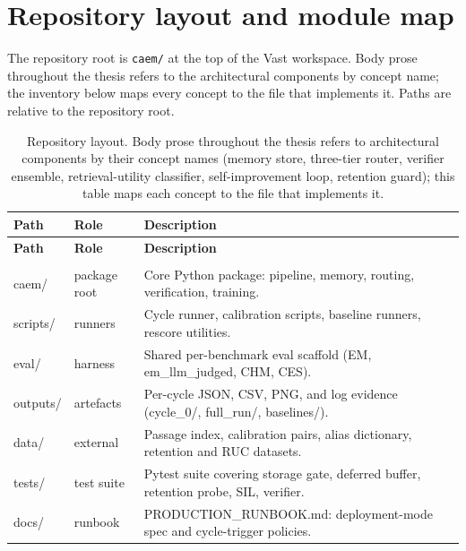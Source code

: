 \section{Repository layout and module map}
\label{app:repo-layout}

The repository root is \verb|caem/| at the top of the Vast workspace. Body prose throughout the thesis refers to the architectural components by concept name; the inventory below maps every concept to the file that implements it. Paths are relative to the repository root.

{\scriptsize
\setlength{\tabcolsep}{4pt}
\renewcommand{\arraystretch}{1.15}
\begin{longtable}{@{}>{\ttfamily}p{5.8cm}p{2.2cm}p{6.6cm}@{}}
\caption[Repository layout]{Repository layout. Body prose throughout the thesis refers to architectural components by their concept names (memory store, three-tier router, verifier ensemble, retrieval-utility classifier, self-improvement loop, retention guard); this table maps each concept to the file that implements it.}
\label{tab:app-repo-layout}\\
\toprule
\textnormal{\textbf{Path}} & \textbf{Role} & \textbf{Description} \\
\midrule
\endfirsthead
\toprule
\textnormal{\textbf{Path}} & \textbf{Role} & \textbf{Description} \\
\midrule
\endhead
\bottomrule
\endfoot
\multicolumn{3}{@{}l}{\textnormal{\textit{Top-level directories}}} \\
caem/              & package root & Core Python package: pipeline, memory, routing, verification, training. \\
scripts/           & runners      & Cycle runner, calibration scripts, baseline runners, rescore utilities. \\
eval/              & harness      & Shared per-benchmark eval scaffold (EM, em\_llm\_judged, CHM, CES). \\
outputs/           & artefacts    & Per-cycle JSON, CSV, PNG, and log evidence (cycle\_0/, full\_run/, baselines/). \\
data/              & external     & Passage index, calibration pairs, alias dictionary, retention and RUC datasets. \\
tests/             & test suite   & Pytest suite covering storage gate, deferred buffer, retention probe, SIL, verifier. \\
docs/              & runbook      & PRODUCTION\_RUNBOOK.md: deployment-mode spec and cycle-trigger policies. \\

\end{longtable}}
